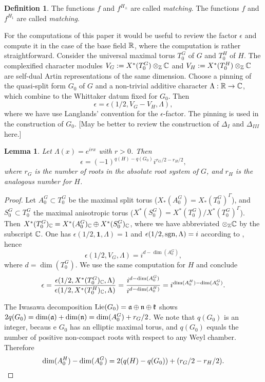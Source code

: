 \documentclass{article}
\newtheorem{lem}[thm]{Lemma}
\theoremstyle{definition}
\newtheorem{dfn}[thm]{Definition}
\numberwithin{equation}{section}
\renewcommand{\-}{\hyp{}}
\newcommand{\warn}[1]{{\leavevmode\color{red}[#1]}}
\begin{document}
\begin{dfn} \label{dfn:matching}
The functions $f$ and $f^{H_\pm}$ are called \emph{matching}. The functions $f$ and $f^{H_1}$ are called \emph{matching}.
\end{dfn}

For the computations of this paper it would be useful to review the factor $\epsilon$ and compute it in the case of the base field $\mathbb{R}$, where the computation is rather straightforward. Consider the universal maximal torus $T_0^G$ of $G$ and $T_0^H$ of $H$. The complexified character modules $V_G := X^*(T_0^G)\otimes_{\mathbb{Z}}\mathbb{C}$ and $V_H := X^*(T_0^H)\otimes_{\mathbb{Z}}\mathbb{C}$ are self-dual Artin representations of the same dimension. Choose a pinning of the quasi-split form $G_0$ of $G$ and a non-trivial additive character $\Lambda : \mathbb{R} \to \mathbb{C}$, which combine to the Whittaker datum fixed for $G_0$. Then
\[ \epsilon = \epsilon(1/2,V_G-V_H,\Lambda), \]
where we have use Langlands' convention \cite[(3.6.4)]{TateCor} for the $\epsilon$-factor. The pinning is used in the construction of $G_0$. \warn{May be better to review the construction of $\Delta_I$ and $\Delta_{III}$ here.}


\begin{lem} \label{lem:epsilon}
Let $\Lambda(x)=e^{irx}$ with $r>0$. Then
\[ \epsilon = (-1)^{q(H)-q(G_0)}i^{r_G/2-r_H/2}, \]
where $r_G$ is the number of roots in the absolute root system of $G$, and $r_H$ is the analogous number for $H$.
\end{lem}
\begin{proof}
Let $A_0^G \subset T_0^G$ be the maximal split torus ($X_*(A_0^G)=X_*(T_0^G)^\Gamma$), and $S_0^G \subset T_0^G$ the maximal anisotropic torus ($X^*(S_0^G)=X^*(T_0^G)/X^*(T_0^G)^\Gamma$). Then $X^*(T_0^G)_{\mathbb{C}}=X^*(A_0^G)_{\mathbb{C}} \oplus X^*(S_0^G)_{\mathbb{C}}$, where we have abbreviated $\otimes_{\mathbb{Z}}\mathbb{C}$ by the subscript $\mathbb{C}$. One has $\epsilon(1/2,\textbf{1},\Lambda)=1$ and $\epsilon(1/2,\textrm{sgn},\Lambda)=i$ according to \cite[(3.2.4)]{TateCor}, hence
\[ \epsilon(1/2,V_G,\Lambda)=i^{d-\dim(A_0^G)}, \]
where $d=\dim(T_0^G)$. We use the same computation for $H$ and conclude
\[ \epsilon=\frac{\epsilon(1/2,X^*(T_0^G)_{\mathbb{C}},\Lambda)}{\epsilon(1/2,X^*(T_0^H)_{\mathbb{C}},\Lambda)} = \frac{i^{d-\dim(A_0^G)}}{i^{d-\dim(A_0^H)}}=i^{\dim(A_0^H)-\dim(A_0^G)}. \]

The Iwasawa decomposition $\textrm{Lie}(G_0)=\mathfrak{a} \oplus\mathfrak{n} \oplus \mathfrak{k}$ shows  $2q(G_0)=\dim(\mathfrak{a})+\dim(\mathfrak{n})=\dim(A_0^G)+r_G/2$. We note that $q(G_0)$ is an integer, becaus e $G_0$ has an elliptic maximal torus, and $q(G_0)$ equals the number of positive non-compact roots with respect to any Weyl chamber. Therefore
\[ \dim(A_0^H)-\dim(A_0^G) = 2(q(H)-q(G_0))+(r_G/2-r_H/2).\qedhere \]
\end{proof}
\end{document}
